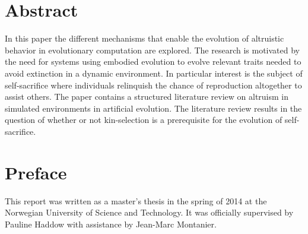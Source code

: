\documentclass[a4paper]{book}
\begin{document}
\thispagestyle{empty}

\cleardoublepage

\frontmatter

\section*{Abstract}


In this paper the different mechanisms that enable the evolution of altruistic behavior in evolutionary computation are explored. 
The research is motivated by the need for systems using embodied evolution to evolve relevant traits needed to avoid extinction in a dynamic environment.
In particular interest is the subject of self-sacrifice where individuals relinquish the chance of reproduction altogether to assist others. 
The paper contains a structured literature review on altruism in simulated environments in artificial evolution. 
The literature review results in the question of whether or not kin-selection is a prerequisite for the evolution of self-sacrifice.  



\clearpage

\section*{Preface}



\vspace{1cm}

This report was written as a master's thesis in the spring of 2014 at the Norwegian University of Science and Technology. It was officially supervised by Pauline Haddow with assistance by Jean-Marc Montanier.

\vfill
\end{document}
